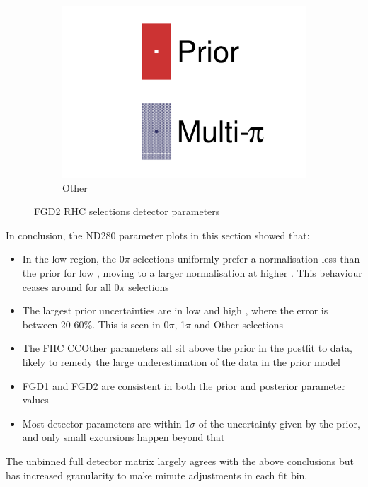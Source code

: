 \begin{figure}[h]
\begin{subfigure}[t]{0.32\textwidth}
		\includegraphics[width=\textwidth,page=57, trim={0mm 0mm 0mm 0mm}, clip]{figures/mach3/2018/data/2018a_FixedCov_RedCov_Mpi_Data_merge_drawPar_withDet}
		\caption{Other}
	\end{subfigure}
	\caption{FGD2 \numu RHC selections detector parameters}
	\label{fig:data_multipi_det_fdg2_numuRHC}
\end{figure}

In conclusion, the ND280 parameter plots in this section showed that:
\begin{itemize}
	\item In the low \cosmu region, the 0$\pi$ selections uniformly prefer a normalisation less than the prior for low \pmu, moving to a larger normalisation at higher \pmu. This behaviour ceases around  for all 0$\pi$ selections
	\item The largest prior uncertainties are in low \cosmu and high \pmu, where the error is between 20-60\%. This is seen in 0$\pi$, 1$\pi$ and Other selections
	\item The FHC \numu CCOther parameters all sit above the prior in the postfit to data, likely to remedy the large underestimation of the data in the prior model
	\item FGD1 and FGD2 are consistent in both the prior and posterior parameter values
	\item Most detector parameters are within 1$\sigma$ of the uncertainty given by the prior, and only small excursions happen beyond that
\end{itemize}
The unbinned full detector matrix largely agrees with the above conclusions but has increased granularity to make minute adjustments in each fit bin.

